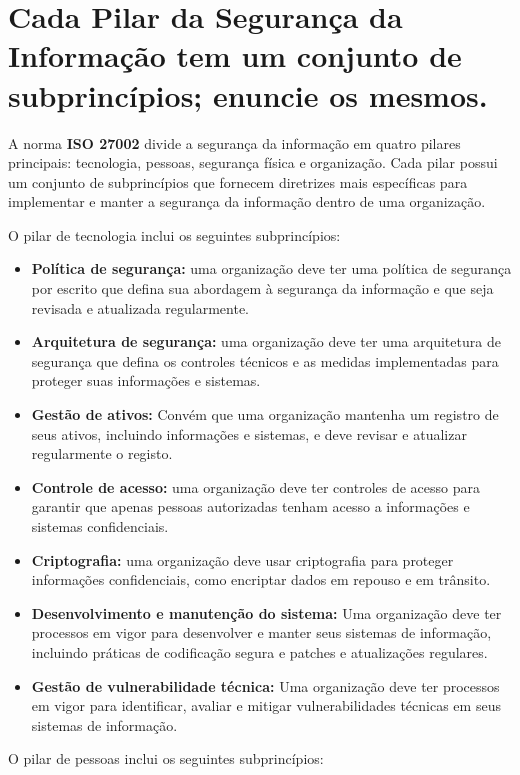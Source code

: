 \section[Pergunta 3]{Cada Pilar da Segurança da Informação tem um conjunto de subprincípios; enuncie os mesmos.}

A norma \textbf{ISO 27002} divide a segurança da informação em quatro pilares principais: tecnologia, pessoas, segurança física e organização. Cada pilar possui um conjunto de subprincípios que fornecem diretrizes mais específicas para implementar e manter a segurança da informação dentro de uma organização.

O pilar de tecnologia inclui os seguintes subprincípios:

\begin{itemize}
  \item \textbf{Política de segurança: }uma organização deve ter uma política de segurança por escrito que defina sua abordagem à segurança da informação e que seja revisada e atualizada regularmente.
  \item \textbf{Arquitetura de segurança: }uma organização deve ter uma arquitetura de segurança que defina os controles técnicos e as medidas implementadas para proteger suas informações e sistemas.
  \item \textbf{Gestão de ativos: }Convém que uma organização mantenha um registro de seus ativos, incluindo informações e sistemas, e deve revisar e atualizar regularmente o registo.
  \item \textbf{Controle de acesso: }uma organização deve ter controles de acesso para garantir que apenas pessoas autorizadas tenham acesso a informações e sistemas confidenciais.
  \item \textbf{Criptografia: }uma organização deve usar criptografia para proteger informações confidenciais, como encriptar dados em repouso e em trânsito.
  \item \textbf{Desenvolvimento e manutenção do sistema: }Uma organização deve ter processos em vigor para desenvolver e manter seus sistemas de informação, incluindo práticas de codificação segura e patches e atualizações regulares.
  \item \textbf{Gestão de vulnerabilidade técnica: }Uma organização deve ter processos em vigor para identificar, avaliar e mitigar vulnerabilidades técnicas em seus sistemas de informação.
\end{itemize}

O pilar de pessoas inclui os seguintes subprincípios:

